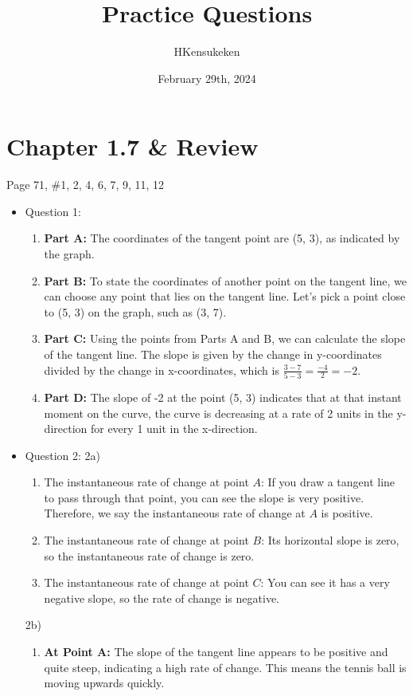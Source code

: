 \documentclass{article}
\title{Practice Questions}
\author{HKensukeken}
\date{February 29th, 2024}
\begin{document}
\maketitle
\section*{Chapter 1.7 \& Review}
Page 71, \#1, 2, 4, 6, 7, 9, 11, 12
\begin{itemize}
\item Question 1:
\begin{enumerate}
    \item \textbf{Part A:} The coordinates of the tangent point are (5, 3), as indicated by the graph.
    
    \item \textbf{Part B:} To state the coordinates of another point on the tangent line, we can choose any point that lies on the tangent line. Let's pick a point close to (5, 3) on the graph, such as (3, 7).
    
    \item \textbf{Part C:} Using the points from Parts A and B, we can calculate the slope of the tangent line. The slope is given by the change in y-coordinates divided by the change in x-coordinates, which is \(\frac{3 - 7}{5 - 3} = \frac{-4}{2} = -2\).
    
    \item \textbf{Part D:} The slope of -2 at the point (5, 3) indicates that at that instant moment on the curve, the curve is decreasing at a rate of 2 units in the y-direction for every 1 unit in the x-direction.
\end{enumerate}

\item Question 2:
2a)
\begin{enumerate}
    \item The instantaneous rate of change at point \(A\): If you draw a tangent line to pass through that point, you can see the slope is very positive. Therefore, we say the instantaneous rate of change at \(A\) is positive.
    
    \item The instantaneous rate of change at point \(B\): Its horizontal slope is zero, so the instantaneous rate of change is zero.
    
    \item The instantaneous rate of change at point \(C\): You can see it has a very negative slope, so the rate of change is negative.
\end{enumerate}
2b)
\begin{enumerate}
    \item \textbf{At Point A:} The slope of the tangent line appears to be positive and quite steep, indicating a high rate of change. This means the tennis ball is moving upwards quickly.
    

\end{enumerate}
\end{itemize}
\end{document}
